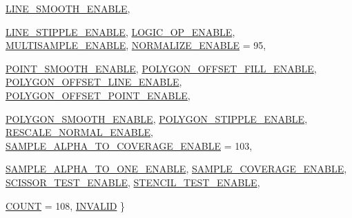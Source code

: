 \begin{DoxyCompactItemize}
\hyperlink{namespaceFUDaePassState_a99a648050f80bc29359e932cffa8c973a49cb43759c0b45b26b5cdaf800b10683}{LINE\_\-SMOOTH\_\-ENABLE}, 
\par
\hyperlink{namespaceFUDaePassState_a99a648050f80bc29359e932cffa8c973a68c891135954ca0f6a0164a122c9e693}{LINE\_\-STIPPLE\_\-ENABLE}, 
\hyperlink{namespaceFUDaePassState_a99a648050f80bc29359e932cffa8c973abe11389e27c95c1d233a71adbd332a64}{LOGIC\_\-OP\_\-ENABLE}, 
\hyperlink{namespaceFUDaePassState_a99a648050f80bc29359e932cffa8c973a73404c7271a0bd91215f5d3b3bdf9978}{MULTISAMPLE\_\-ENABLE}, 
\hyperlink{namespaceFUDaePassState_a99a648050f80bc29359e932cffa8c973ad8e102b3562f563c4601109ddefa88f6}{NORMALIZE\_\-ENABLE} =  95, 
\par
\hyperlink{namespaceFUDaePassState_a99a648050f80bc29359e932cffa8c973af0ab6e7a3272177631afd69e05bcff3a}{POINT\_\-SMOOTH\_\-ENABLE}, 
\hyperlink{namespaceFUDaePassState_a99a648050f80bc29359e932cffa8c973af10e1b081ecde19b48720d978cd5df22}{POLYGON\_\-OFFSET\_\-FILL\_\-ENABLE}, 
\hyperlink{namespaceFUDaePassState_a99a648050f80bc29359e932cffa8c973a237b07a8a123fe1b3e16b35ea88a16df}{POLYGON\_\-OFFSET\_\-LINE\_\-ENABLE}, 
\hyperlink{namespaceFUDaePassState_a99a648050f80bc29359e932cffa8c973ab7e3147f070bdbbc111ddf39f10a0aa0}{POLYGON\_\-OFFSET\_\-POINT\_\-ENABLE}, 
\par
\hyperlink{namespaceFUDaePassState_a99a648050f80bc29359e932cffa8c973af34ea2c07f9abe7593737b91fc72a085}{POLYGON\_\-SMOOTH\_\-ENABLE}, 
\hyperlink{namespaceFUDaePassState_a99a648050f80bc29359e932cffa8c973a0a31b2418fe60358e777cac203621b83}{POLYGON\_\-STIPPLE\_\-ENABLE}, 
\hyperlink{namespaceFUDaePassState_a99a648050f80bc29359e932cffa8c973a9c77e2c493bc841dd79ea1edb847907a}{RESCALE\_\-NORMAL\_\-ENABLE}, 
\hyperlink{namespaceFUDaePassState_a99a648050f80bc29359e932cffa8c973a49d5cad42c586cf8df761324320e8bd0}{SAMPLE\_\-ALPHA\_\-TO\_\-COVERAGE\_\-ENABLE} =  103, 
\par
\hyperlink{namespaceFUDaePassState_a99a648050f80bc29359e932cffa8c973ad0f69288f917a56af0fb5540202a4af2}{SAMPLE\_\-ALPHA\_\-TO\_\-ONE\_\-ENABLE}, 
\hyperlink{namespaceFUDaePassState_a99a648050f80bc29359e932cffa8c973ab5d6a8ee493e755a0edd8e52856dd944}{SAMPLE\_\-COVERAGE\_\-ENABLE}, 
\hyperlink{namespaceFUDaePassState_a99a648050f80bc29359e932cffa8c973aefbd3022e583ca773c7fd86e4d12f5d0}{SCISSOR\_\-TEST\_\-ENABLE}, 
\hyperlink{namespaceFUDaePassState_a99a648050f80bc29359e932cffa8c973a0df6cd3f6d4b51a3a7beccdd94ce3844}{STENCIL\_\-TEST\_\-ENABLE}, 
\par
\hyperlink{namespaceFUDaePassState_a99a648050f80bc29359e932cffa8c973a17d0b5ceab6281c6cf7540a2da8ed95b}{COUNT} =  108, 
\hyperlink{namespaceFUDaePassState_a99a648050f80bc29359e932cffa8c973a3425d6726adb3b7b0321143b1f93ebc2}{INVALID}
 \}
\end{DoxyCompactItemize}
